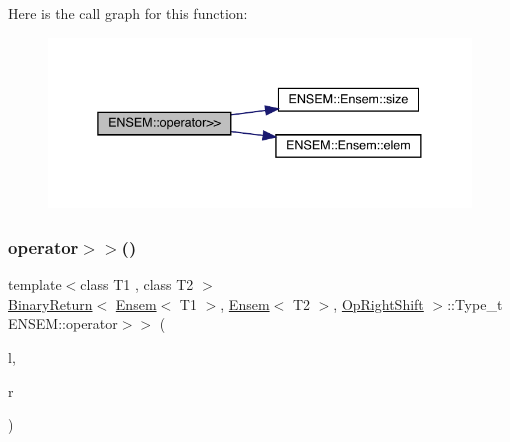 Here is the call graph for this function\+:\nopagebreak
\begin{figure}[H]
\begin{center}
\leavevmode
\includegraphics[width=338pt]{d1/d9e/group__eensem_ga607184316d75a7cc8f6e0b082332832e_cgraph}
\end{center}
\end{figure}
\mbox{\label{group__eensem_ga8b0f105a14d5692cffad3db6bae659fb}} 
\subsubsection{\texorpdfstring{operator$>$$>$()}{operator>>()}\hspace{0.1cm}{\footnotesize\ttfamily [2/4]}}
{\footnotesize\ttfamily template$<$class T1 , class T2 $>$ \\
\mbox{\hyperlink{structENSEM_1_1BinaryReturn}{Binary\+Return}}$<$ \mbox{\hyperlink{classENSEM_1_1Ensem}{Ensem}}$<$ T1 $>$, \mbox{\hyperlink{classENSEM_1_1Ensem}{Ensem}}$<$ T2 $>$, \mbox{\hyperlink{structENSEM_1_1OpRightShift}{Op\+Right\+Shift}} $>$\+::Type\+\_\+t E\+N\+S\+E\+M\+::operator$>$$>$ (\begin{DoxyParamCaption}\item[{const \mbox{\hyperlink{classENSEM_1_1Ensem}{Ensem}}$<$ T1 $>$ \&}]{l,  }\item[{const \mbox{\hyperlink{classENSEM_1_1Ensem}{Ensem}}$<$ T2 $>$ \&}]{r }\end{DoxyParamCaption})\hspace{0.3cm}{\ttfamily [inline]}}

